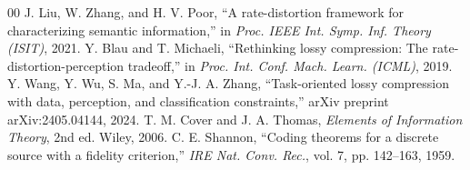 \documentclass[conference]{IEEEtran}
\begin{document}
\begin{thebibliography}{00}
 J. Liu, W. Zhang, and H. V. Poor, ``A rate-distortion framework for characterizing semantic information,'' in \textit{Proc. IEEE Int. Symp. Inf. Theory (ISIT)}, 2021.
 Y. Blau and T. Michaeli, ``Rethinking lossy compression: The rate-distortion-perception tradeoff,'' in \textit{Proc. Int. Conf. Mach. Learn. (ICML)}, 2019.
 Y. Wang, Y. Wu, S. Ma, and Y.-J. A. Zhang, ``Task-oriented lossy compression with data, perception, and classification constraints,'' arXiv preprint arXiv:2405.04144, 2024.
 T. M. Cover and J. A. Thomas, \textit{Elements of Information Theory}, 2nd ed. Wiley, 2006.
 C. E. Shannon, ``Coding theorems for a discrete source with a fidelity criterion,'' \textit{IRE Nat. Conv. Rec.}, vol. 7, pp. 142--163, 1959.
\end{thebibliography}
\end{document}
